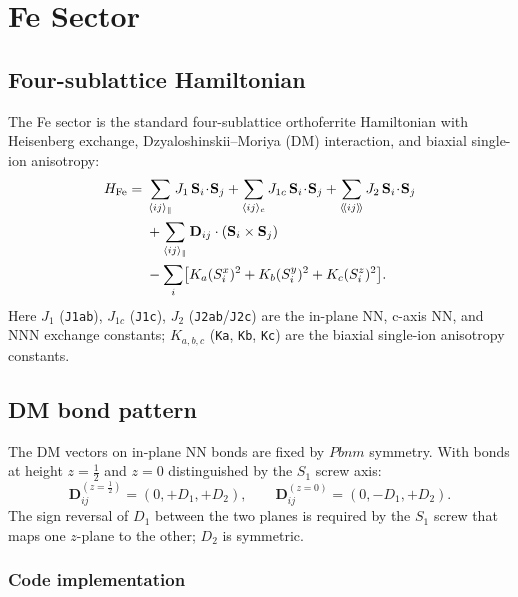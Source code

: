 \documentclass[11pt]{article}
\newcommand{\bS}{\mathbf{S}}
\newcommand{\bD}{\mathbf{D}}
\begin{document}
\section{Fe Sector}
\label{sec:Fe}

\subsection{Four-sublattice Hamiltonian}

The Fe sector is the standard four-sublattice orthoferrite Hamiltonian
with Heisenberg exchange, Dzyaloshinskii--Moriya (DM) interaction, and
biaxial single-ion anisotropy:
\begin{equation}
\begin{aligned}
H_{\rm Fe} = {}&
\sum_{\langle ij\rangle_{\parallel}} J_1\,\bS_i\!\cdot\!\bS_j
 + \sum_{\langle ij\rangle_c} J_{1c}\,\bS_i\!\cdot\!\bS_j
 + \sum_{\langle\!\langle ij\rangle\!\rangle} J_2\,\bS_i\!\cdot\!\bS_j\\
 &+\sum_{\langle ij\rangle_{\parallel}} \bD_{ij}\cdot(\bS_i\times\bS_j)\\
 &- \sum_i \bigl[K_a(S_i^x)^2 + K_b(S_i^y)^2 + K_c(S_i^z)^2\bigr].
\end{aligned}
\label{eq:HFe}
\end{equation}
Here $J_1$ (\texttt{J1ab}), $J_{1c}$ (\texttt{J1c}), $J_2$
(\texttt{J2ab}/\texttt{J2c}) are the in-plane NN, c-axis NN, and NNN
exchange constants; $K_{a,b,c}$ (\texttt{Ka}, \texttt{Kb}, \texttt{Kc})
are the biaxial single-ion anisotropy constants.

\subsection{DM bond pattern}

The DM vectors on in-plane NN bonds are fixed by $Pbnm$ symmetry.
With bonds at height $z = \tfrac{1}{2}$ and $z = 0$ distinguished by
the $S_1$ screw axis:
\begin{equation}
\bD^{(z=\tfrac{1}{2})}_{ij} = (0,+D_1,+D_2),\qquad
\bD^{(z=0)}_{ij} = (0,-D_1,+D_2).
\label{eq:Dpattern}
\end{equation}
The sign reversal of $D_1$ between the two planes is required by
the $S_1$ screw that maps one $z$-plane to the other; $D_2$ is
symmetric.

\subsubsection*{Code implementation}
\end{document}
